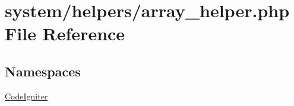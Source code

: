 \hypertarget{array__helper_8php}{\section{system/helpers/array\-\_\-helper.php File Reference}
\label{array__helper_8php}
}
\subsection*{Namespaces}
\begin{DoxyCompactItemize}
\item 
\hyperlink{namespace_code_igniter}{Code\-Igniter}
\end{DoxyCompactItemize}
